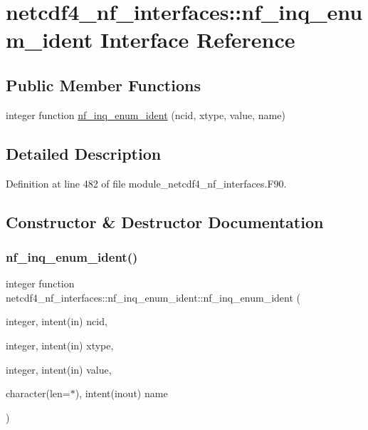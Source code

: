 \hypertarget{interfacenetcdf4__nf__interfaces_1_1nf__inq__enum__ident}{}\section{netcdf4\+\_\+nf\+\_\+interfaces\+:\+:nf\+\_\+inq\+\_\+enum\+\_\+ident Interface Reference}
\label{interfacenetcdf4__nf__interfaces_1_1nf__inq__enum__ident}
\subsection*{Public Member Functions}
\begin{DoxyCompactItemize}
\item 
integer function \hyperlink{interfacenetcdf4__nf__interfaces_1_1nf__inq__enum__ident_a91b31862086deaf675e878175a7454d8}{nf\+\_\+inq\+\_\+enum\+\_\+ident} (ncid, xtype, value, name)
\end{DoxyCompactItemize}


\subsection{Detailed Description}


Definition at line 482 of file module\+\_\+netcdf4\+\_\+nf\+\_\+interfaces.\+F90.



\subsection{Constructor \& Destructor Documentation}
\mbox{\label{interfacenetcdf4__nf__interfaces_1_1nf__inq__enum__ident_a91b31862086deaf675e878175a7454d8}} 
\subsubsection{\texorpdfstring{nf\+\_\+inq\+\_\+enum\+\_\+ident()}{nf\_inq\_enum\_ident()}}
{\footnotesize\ttfamily integer function netcdf4\+\_\+nf\+\_\+interfaces\+::nf\+\_\+inq\+\_\+enum\+\_\+ident\+::nf\+\_\+inq\+\_\+enum\+\_\+ident (\begin{DoxyParamCaption}\item[{integer, intent(in)}]{ncid,  }\item[{integer, intent(in)}]{xtype,  }\item[{integer, intent(in)}]{value,  }\item[{character(len=$\ast$), intent(inout)}]{name }\end{DoxyParamCaption})}



